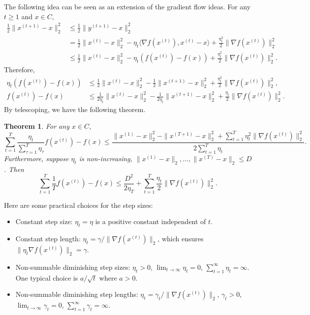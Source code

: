 \documentclass[openany]{book}
\newtheorem{theorem}{Theorem}[chapter]
\theoremstyle{definition}
\theoremstyle{remark}
\begin{document}
The following idea can be seen as an extension of the gradient flow ideas. For any $t\ge1$ and $x\in C$,
\begin{align*}
    \frac{1}{2}\|x^{(t+1)}-x\|_2^2 & \le \frac{1}{2}\|y^{(t+1)}-x\|_2^2 \\
     & =\frac{1}{2}\|x^{(t)}-x\|_2^2-\eta_t \langle\nabla f(x^{(t)}),x^{(t)}-x\rangle+\frac{\eta_t^2}{2}\|\nabla f(x^{(t)})\|_2^2 \\
     & \le \frac{1}{2}\|x^{(t)}-x\|_2^2-\eta_t\left(f(x^{(t)})-f(x)\right)+\frac{\eta_t^2}{2}\|\nabla f(x^{(t)})\|_2^2.
\end{align*}
Therefore,
\begin{align*}
    \eta_t\left(f(x^{(t)})-f(x)\right) & \le \frac{1}{2}\|x^{(t)}-x\|_2^2-\frac{1}{2}\|x^{(t+1)}-x\|_2^2+\frac{\eta_t^2}{2}\|\nabla f(x^{(t)})\|_2^2, \\
    f(x^{(t)})-f(x) & \le \frac{1}{2\eta_t}\|x^{(t)}-x\|_2^2-\frac{1}{2\eta_t}\|x^{(t+1)}-x\|_2^2+\frac{\eta_t}{2}\|\nabla f(x^{(t)})\|_2^2.
\end{align*}
By telescoping, we have the following theorem.
\begin{theorem}\label{thm:GDBound}
    For any $x\in C$,
    \begin{equation*}
        \sum_{t=1}^{T}\frac{\eta_t}{\sum_{\tau=1}^{T}\eta_{\tau}}f(x^{(t)})-f(x)\le\frac{\|x^{(1)}-x\|_2^2-\|x^{(T+1)}-x\|_2^2+\sum_{t=1}^{T}\eta_t^2\|\nabla f(x^{(t)})\|_2^2}{2 \sum_{t=1}^{T}\eta_t}.
    \end{equation*}
    Furthermore, suppose $\eta_t$ is non-increasing, $\|x^{(1)}-x\|_2,\ldots,\|x^{(T)}-x\|_2\le D$. Then
    \begin{equation*}
        \sum_{t=1}^{T}\frac{1}{T}f(x^{(t)})-f(x)\le \frac{D^2}{2\eta_T}+\sum_{t=1}^{T}\frac{\eta_t}{2}\|\nabla f(x^{(t)})\|_2^2.
    \end{equation*}
\end{theorem}

Here are some practical choices for the step sizes:
\begin{itemize}
\item Constant step size: $\eta_t=\eta$ is a positive constant independent of $t$.
\item Constant step length: $\eta_t=\gamma/\|\nabla f(x^{(t)})\|_2$, which ensures $\|\eta_t\nabla f(x^{(t)})\|_2=\gamma$.
\item Non-summable diminishing step sizes: $\eta_t>0$, $\lim_{t\rightarrow\infty}\eta_t=0$, $\sum_{t=1}^{\infty}\eta_t=\infty$. One typical choice is $a/\sqrt{t}$ where $a>0$.
\item Non-summable diminishing step lengths: $\eta_t=\gamma_t/\|\nabla f(x^{(t)})\|_2$, $\gamma_t>0$, $\lim_{t\rightarrow\infty}\gamma_t=0$, $\sum_{t=1}^{\infty}\gamma_t=\infty$.
\end{itemize}
\end{document}
